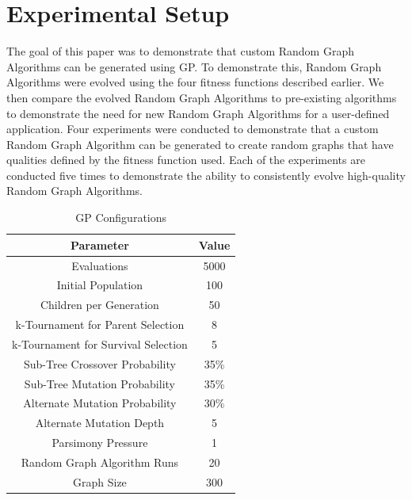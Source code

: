 \documentclass{article}
\begin{document}
\section{Experimental Setup}
The goal of this paper was to demonstrate that custom Random Graph Algorithms can be generated using GP. To demonstrate this, Random Graph Algorithms were evolved
using the four fitness functions described earlier. We then compare the evolved Random Graph Algorithms to pre-existing algorithms to demonstrate the need for new
Random Graph Algorithms for a user-defined application. Four experiments were conducted to demonstrate that a custom Random Graph Algorithm can be generated to 
create random graphs that have qualities defined by the fitness function used. Each of the experiments are conducted five times to demonstrate the ability to 
consistently evolve high-quality Random Graph Algorithms.

\begin{table}
    \begin{center}
    \begin{tabular}{|c|c|}
        \hline
        \textbf{Parameter} &\textbf{Value}\\ \hline
        Evaluations&5000\\ \hline
        Initial Population&100\\ \hline
        Children per Generation&50\\ \hline
        k-Tournament for Parent Selection&8\\ \hline
        k-Tournament for Survival Selection&5\\ \hline
	    Sub-Tree Crossover Probability& 35\% \\ \hline
	    Sub-Tree Mutation Probability& 35\% \\ \hline
	    Alternate Mutation Probability& 30\% \\ \hline
	    Alternate Mutation Depth& 5\\ \hline
	    Parsimony Pressure & 1\\ \hline
        Random Graph Algorithm Runs&20\\ \hline
        Graph Size&300\\ \hline
    \end{tabular}
    \end{center}
\caption{GP Configurations}
  \label{tab:GP}
\end{table}
\end{document}
